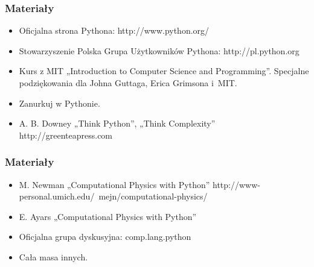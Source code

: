 \documentclass[10pt,t]{beamer}
\begin{document}
\begin{frame}
  \frametitle{Materiały}


  \begin{itemize}

  \item Oficjalna strona Pythona: http://www.python.org/

  \item Stowarzyszenie Polska Grupa Użytkowników Pythona:
    http://pl.python.org

  \item Kurs z MIT „Introduction to Computer Science and Programming”.
    Specjalne podziękowania dla Johna Guttaga, Erica Grimsona i~MIT.

  \item Zanurkuj w Pythonie.

  \item A. B. Downey „Think Python”, „Think Complexity”
    http://greenteapress.com

  \end{itemize}

\end{frame}





\begin{frame}
  \frametitle{Materiały}


  \begin{itemize}

  \item M. Newman „Computational Physics with Python”
    http://www-personal.umich.edu/~mejn/computational-physics/

  \item E. Ayars „Computational Physics with Python”

  \item Oficjalna grupa dyskusyjna: comp.lang.python

  \item Cała masa innych.

  \end{itemize}

\end{frame}
















\end{document}
